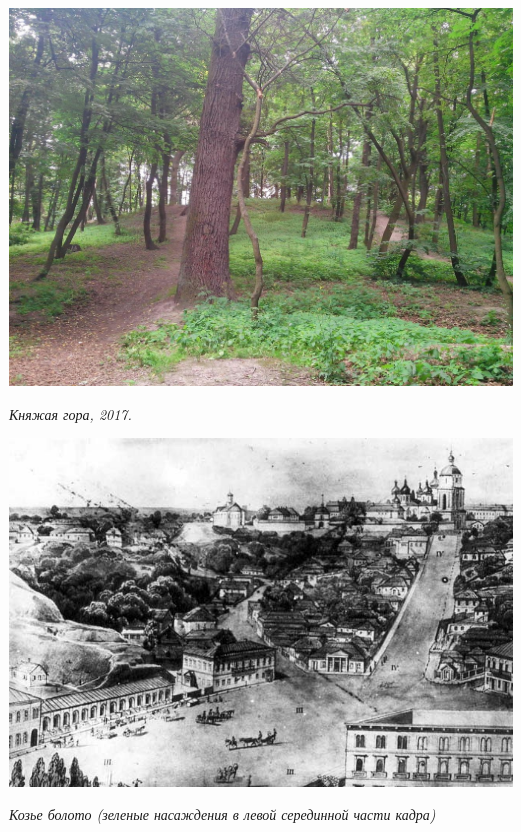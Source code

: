 \vspace*{\fill}





\newpage

\begin{center}
\includegraphics[width=\linewidth]{rpix/IMG_20170611_145933.jpg}

\textit{Княжая гора, 2017.}
\end{center}



\begin{center}
\includegraphics[width=\linewidth]{rpix/koz-bol.jpg}

\textit{Козье болото (зеленые насаждения в левой серединной части кадра)}
\end{center}



